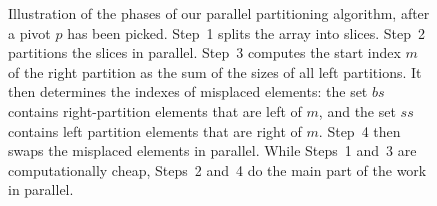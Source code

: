 \documentclass[sn-mathphys,Numbered]{sn-jnl}
\theoremstyle{thmstyleone}%
\theoremstyle{definition}%
\theoremstyle{thmstylethree}%
\begin{document}
\begin{figure}

    \caption{Illustration of the phases of our parallel partitioning algorithm, after a pivot $p$ has been picked.
      Step~1 splits the array into slices. Step~2 partitions the slices in parallel. Step~3 computes the start
      index $m$ of the right partition as the sum of the sizes of all left partitions. It then determines the indexes
      of misplaced elements: the set $bs$ contains right-partition elements that are left of $m$,
      and the set $ss$ contains left partition elements that are right of $m$. Step~4 then swaps the misplaced elements in parallel.
      While Steps~1 and~3 are computationally cheap, Steps~2 and~4 do the main part of the work in parallel.
%
    }\label{fig:ppar}
  \end{figure}
\end{document}
